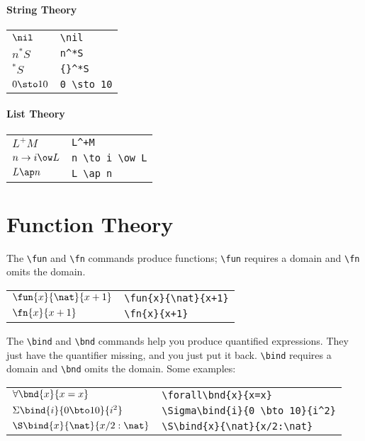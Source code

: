\documentclass{article}
\begin{document}
\paragraph{String Theory}
\begin{center}
\begin{tabular}{ll}
$\nil$ & \verb$\nil$ \\
$n^*S$ & \verb$n^*S$ \\
${}^*S$ & \verb${}^*S$ \\
$0 \sto 10$ & \verb$0 \sto 10$
\end{tabular}
\end{center}

\paragraph{List Theory}
\begin{center}
\begin{tabular}{ll}
$L^+M$ & \verb$L^+M$ \\
$n \to i \ow L$ & \verb$n \to i \ow L$ \\
$L \ap n$ & \verb$L \ap n$
\end{tabular}
\end{center}


\section{Function Theory}
The \verb|\fun| and \verb|\fn| commands produce functions; \verb|\fun|
requires a domain and \verb|\fn| omits the domain.
\begin{center}
\begin{tabular}{ll}
$\fun{x}{\nat}{x+1}$ & \verb$\fun{x}{\nat}{x+1}$ \\
$\fn{x}{x+1}$ & \verb$\fn{x}{x+1}$
\end{tabular}
\end{center}

The \verb|\bind| and \verb|\bnd| commands help you produce quantified
expressions.  They just have the quantifier missing, and you just put
it back.  \verb|\bind| requires a domain and \verb|\bnd| omits the
domain.  Some examples:
\begin{center}
\begin{tabular}{ll}
$\forall\bnd{x}{x=x}$ & \verb$\forall\bnd{x}{x=x}$ \\
$\Sigma\bind{i}{0 \bto 10}{i^2}$ & \verb$\Sigma\bind{i}{0 \bto 10}{i^2}$ \\
$\S\bind{x}{\nat}{x/2:\nat}$ & \verb$\S\bind{x}{\nat}{x/2:\nat}$
\end{tabular}
\end{center}
\end{document}
